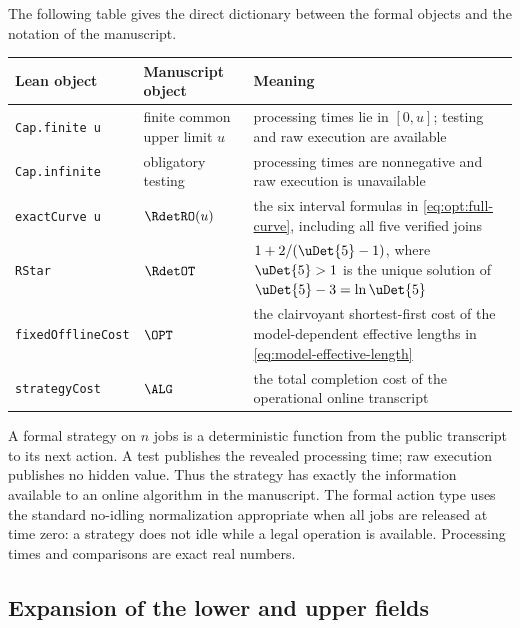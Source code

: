The following table gives the direct dictionary between the formal objects
and the notation of the manuscript.

\begin{center}
\small
\begin{tabular}{@{}p{}p{}p{}@{}}
\toprule
Lean object & Manuscript object & Meaning \\
\midrule
\texttt{Cap.finite u}
  & finite common upper limit \(u\)
  & processing times lie in \([0,u]\); testing and raw execution are
    available \\
\texttt{Cap.infinite}
  & obligatory testing
  & processing times are nonnegative and raw execution is unavailable \\
\texttt{exactCurve u}
  & \(\RdetRO(u)\)
  & the six interval formulas in \cref{eq:opt:full-curve}, including all five
    verified joins \\
\texttt{RStar}
  & \(\RdetOT\)
  & \(1+2/(\uDet{5}-1)\), where \(\uDet{5}>1\) is the unique solution of
    \(\uDet{5}-3=\ln\uDet{5}\) \\
\texttt{fixedOfflineCost}
  & \(\OPT\)
  & the clairvoyant shortest-first cost of the model-dependent effective
    lengths in \cref{eq:model-effective-length} \\
\texttt{strategyCost}
  & \(\ALG\)
  & the total completion cost of the operational online transcript \\
\bottomrule
\end{tabular}
\end{center}

A formal strategy on \(n\) jobs is a deterministic function from the public
transcript to its next action.  A test publishes the revealed processing
time; raw execution publishes no hidden value.  Thus the strategy has exactly
the information available to an online algorithm in the manuscript.  The
formal action type uses the standard no-idling normalization appropriate when
all jobs are released at time zero: a strategy does not idle while a legal
operation is available.  Processing times and comparisons are
exact real numbers.

\subsection{Expansion of the lower and upper fields}

